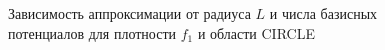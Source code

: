 \documentclass[a4paper, 12pt]{article}
\begin{document}
  \begin{figure}[h!]
    \noindent{}
    \caption{Зависимость аппроксимации от радиуса $L$ и числа базисных потенциалов для плотности $f_1$ и области CIRCLE}
    \label{nolnol}
    \end{figure} 
\end{document}
